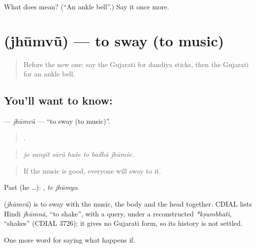 \begin{tcolorbox}[breakable,colback=teal!4,colframe=teal!35!black,title={Before you move on}]
What does  mean? (\textquotedblleft{}An ankle bell\textquotedblright{}.) Say it once more.
\end{tcolorbox}
\section[\texorpdfstring{\gu{ઝૂમવું} (jhūmvũ)}{ઝૂમવું (jhūmvũ)}]{ (jhūmvũ) — to sway (to music)}

\label{lesson:GU-C554-jhumvu}



\begin{quote}
Before the new one: say the Gujarati for dandiya sticks, then the Gujarati for an ankle bell.
\end{quote}

\subsection*{You'll want to know: }
\textbf{} — \emph{jhūmvũ} — \textquotedblleft{}to sway (to music)\textquotedblright{}.

\begin{quote}
      .
\end{quote}

\begin{quote}
\emph{jo sangīt sārũ haśe to badhā jhūmśe.}
\end{quote}

\begin{quote}
If the music is good, everyone will sway to it.
\end{quote}

Past (he …):  , \emph{te jhūmyo}.

\begin{cousinweb}
\textbf{} (\emph{jhūmvũ}) is to sway with the music, the body and the head together. CDIAL lists Hindi \emph{jhūmnā}, \textquotedblleft{}to shake\textquotedblright{}, with a query, under a reconstructed \emph{*kṣumbhati}, \textquotedblleft{}shakes\textquotedblright{} (CDIAL 3726); it gives no Gujarati form, so its history is not settled.
\end{cousinweb}

\begin{grammarlens}[title={What you've built}]
One more word for saying what happens if.
\end{grammarlens}

